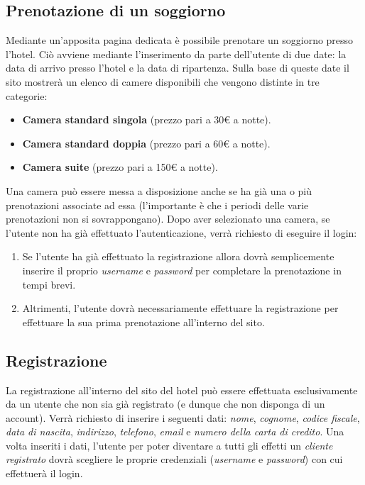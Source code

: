 \documentclass [a4paper, 12pt]{book}
\begin{document}
\subsection{Prenotazione di un soggiorno}
\label{PrenotazioneCamera}
Mediante un'apposita pagina dedicata è possibile prenotare un soggiorno presso l'hotel. Ciò avviene mediante l'inserimento da parte dell'utente di due date: la data di arrivo presso l'hotel e la data di ripartenza. Sulla base di queste date il sito mostrerà un elenco di camere disponibili che vengono distinte in tre categorie:
\begin{itemize}
\item \textbf{Camera standard singola} (prezzo pari a 30€ a notte).
\item \textbf{Camera standard doppia} (prezzo pari a 60€ a notte).
\item \textbf{Camera suite} (prezzo pari a 150€ a notte).
\end{itemize}
Una camera può essere messa a disposizione anche se ha già una o più prenotazioni associate ad essa (l'importante è che i periodi delle varie prenotazioni non si sovrappongano). Dopo aver selezionato una camera, se l'utente non ha già effettuato l'autenticazione, verrà richiesto di eseguire il login:
\begin{enumerate}
\item Se l'utente ha già effettuato la registrazione allora dovrà semplicemente inserire il proprio \textit{username} e \textit{password} per completare la prenotazione in tempi brevi.
\item Altrimenti, l'utente dovrà necessariamente effettuare la registrazione per effettuare la sua prima prenotazione all'interno del sito.
\end{enumerate}


\subsection{Registrazione}
La registrazione all'interno del sito del hotel può essere effettuata esclusivamente da un utente che non sia già registrato (e dunque che non disponga di un account). Verrà richiesto di inserire i seguenti dati: \textit{nome}, \textit{cognome}, \textit{codice fiscale}, \textit{data di nascita}, \textit{indirizzo}, \textit{telefono}, \textit{email} e \textit{numero della carta di credito}. Una volta inseriti i dati, l'utente per poter diventare a tutti gli effetti un \textit{cliente registrato} dovrà scegliere le proprie credenziali (\textit{username} e \textit{password}) con cui effettuerà il login.
\end{document}
